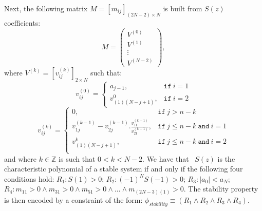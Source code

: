 \documentclass[final]{sig-alternate-05-2015}
\newcommand{\red}[1]{{\color{red}#1}}
\begin{document}
Next, the following matrix
$M = [m_{ij}]_{(2N-2)\times N}$ is built from $S(z)$ coefficients:
%
$$
M=\left( 
\begin{array}{c}
V^{(0)}\\
V^{(1)}\\
\vdots\\
V^{(N-2)}
\end{array}
\right), 
$$
%
where $V^{(k)} = [v^{(k)}_{ij} ]_{2\times N}$ such that:
%
$$
v_{ij}^{(0)}=\left\{
\begin{array}{ll}
a_{j-1}, & \texttt{if}~i=1\\
v_{(1)(N-j+1)}^{0},&\texttt{if}~i=2
\end{array}
\right.
$$
%
$$
v_{ij}^{(k)}=\left\{
\begin{array}{ll}
0,&\texttt{if}~j>n-k\\
v_{1j}^{(k-1)}-v_{2j}^{(k-1)} . \frac{v_{11}^{(k-1)}}{v_{21}^{(k-1)}}, & \texttt{if}~j\leq n-k ~\texttt{and}~i=1\\
v_{(1)(N-j+1)}^{k},& \texttt{if}~j\leq n-k ~\texttt{and}~i=2\\
\end{array}
\right.
$$
%
and where $k \in \mathbb{Z}$ is such that $0 < k < N - 2$. 
We have that~\cite{astrom1997computer} 
$S(z)$ is the
characteristic polynomial of a stable system if and only if the following four conditions hold:
$R_1: S(1) > 0$;
$R_2: (−1)^N S(−1) > 0$;
$R_3: |a_0| < a_N$;
$R_4: m_{11} > 0 \wedge\allowbreak
      m_{31}>0 \wedge\allowbreak
      m_{51}>0 \wedge \ldots \wedge\allowbreak
      m_{(2N{-}3)(1)}>0$.
%
The stability property is then encoded by a constraint of the form:
$
\phi_\mathit{stability} \equiv (R_1 \wedge R_2 \wedge R_3 \wedge R_4).
$
\end{document}
